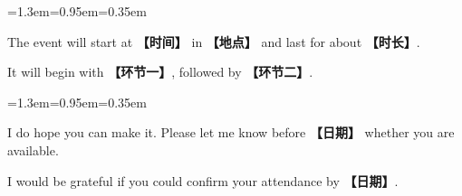 \documentclass[10pt,a4paper]{ctexart}
\begin{document}
\par\vspace{1pt}
\begin{list}{}{\leftmargin=1.3em=0.95em=0.35em\itemindent=0pt\topsep=0pt\partopsep=0pt\parsep=1.5pt\itemsep=0pt}
\item[{\color{accent}\scriptsize$\blacktriangleright$}]{\footnotesize The event will start at {\color{accent}\bfseries 【时间】} in {\color{accent}\bfseries 【地点】} and last for about {\color{accent}\bfseries 【时长】}.}\par{}
\item[{\color{accent}\scriptsize$\blacktriangleright$}]{\footnotesize It will begin with {\color{accent}\bfseries 【环节一】}, followed by {\color{accent}\bfseries 【环节二】}.}\par{}
\end{list}
\par\vspace{1pt}
\begin{list}{}{\leftmargin=1.3em=0.95em=0.35em\itemindent=0pt\topsep=0pt\partopsep=0pt\parsep=1.5pt\itemsep=0pt}
\item[{\color{accent}\scriptsize$\blacktriangleright$}]{\footnotesize I do hope you can make it. Please let me know before {\color{accent}\bfseries 【日期】} whether you are available.}\par{}
\item[{\color{accent}\scriptsize$\blacktriangleright$}]{\footnotesize I would be grateful if you could confirm your attendance by {\color{accent}\bfseries 【日期】}.}\par{}
\end{list}
\par
\end{document}
